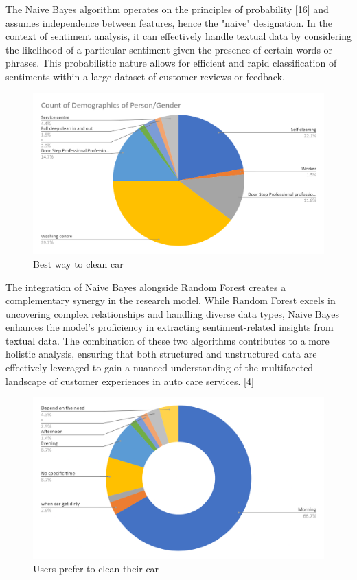 \documentclass[conference]{IEEEtran}
\begin{document}
The Naive Bayes algorithm operates on the principles of probability [16] and assumes independence between features, hence the "naive" designation. In the context of sentiment analysis, it can effectively handle textual data by considering the likelihood of a particular sentiment given the presence of certain words or phrases. This probabilistic nature allows for efficient and rapid classification of sentiments within a large dataset of customer reviews or feedback.
\begin{figure}[htbp]
\centering
\includegraphics[scale=0.2]{Fig3.png}
\caption{Best way to clean car}
\label{fig}
\end{figure}
The integration of Naive Bayes alongside Random Forest creates a complementary synergy in the research model. While Random Forest excels in uncovering complex relationships and handling diverse data types, Naive Bayes enhances the model's proficiency in extracting sentiment-related insights from textual data. The combination of these two algorithms contributes to a more holistic analysis, ensuring that both structured and unstructured data are effectively leveraged to gain a nuanced understanding of the multifaceted landscape of customer experiences in auto care services. [4] 
\begin{figure}[htbp]
\centering
\includegraphics[scale=0.2]{Fig4.png}
\caption{Users prefer to clean their car}
\label{fig}
\end{figure}
\end{document}
